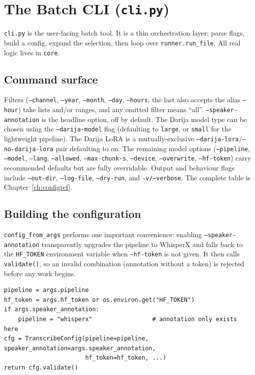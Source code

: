 \documentclass[11pt,a4paper]{report}
\newcommand{\code}[1]{\texttt{\small #1}}
\begin{document}
\chapter{The Batch CLI (\texttt{cli.py})}
\label{ch:cli}

\code{cli.py} is the user-facing batch tool. It is a thin orchestration layer:
parse flags, build a config, expand the selection, then loop over
\code{runner.run\_file}. All real logic lives in \texttt{core}.

\section{Command surface}

Filters (\code{--channel}, \code{--year}, \code{--month}, \code{--day},
\code{--hours}; the last also accepts the alias \code{--hour}) take lists and/or
ranges, and any omitted filter means ``all''. \code{--speaker-annotation} is the
headline option, off by default. The Darija model type can be chosen using the
\code{--darija-model} flag (defaulting to \code{large}, or \code{small} for the
lightweight pipeline). The Darija LoRA is a mutually-exclusive
\code{--darija-lora}/\code{--no-darija-lora} pair defaulting to on. The remaining
model options (\code{--pipeline}, \code{--model}, \code{--lang},
\code{--allowed}, \code{--max-chunk-s}, \code{--device}, \code{--overwrite},
\code{--hf-token}) carry recommended defaults but are fully overridable. Output
and behaviour flags include \code{--out-dir}, \code{--log-file},
\code{--dry-run}, and \code{-v/--verbose}. The complete table is
Chapter~\ref{ch:configref}.

\section{Building the configuration}

\code{config\_from\_args} performs one important convenience: enabling
\code{--speaker-annotation} transparently upgrades the pipeline to WhisperX and
falls back to the \code{HF\_TOKEN} environment variable when \code{--hf-token} is
not given. It then calls \code{validate()}, so an invalid combination (annotation
without a token) is rejected before any work begins.

\begin{lstlisting}[caption={Annotation auto-upgrade.}]
pipeline = args.pipeline
hf_token = args.hf_token or os.environ.get("HF_TOKEN")
if args.speaker_annotation:
    pipeline = "whisperx"                 # annotation only exists here
cfg = TranscribeConfig(pipeline=pipeline, speaker_annotation=args.speaker_annotation,
                       hf_token=hf_token, ...)
return cfg.validate()
\end{lstlisting}
\end{document}
